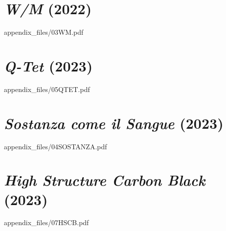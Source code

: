         
            

\chapter{\textit{W/M} (2022)}

        
            {appendix_files/03WM.pdf}
    

\chapter{\textit{Q-Tet} (2023)}

        
            {appendix_files/05QTET.pdf}
    

\chapter{\textit{Sostanza come il Sangue} (2023)}
    
        
            {appendix_files/04SOSTANZA.pdf}
    

\chapter{\textit{High Structure Carbon Black} (2023)}

        
            {appendix_files/07HSCB.pdf}
    
